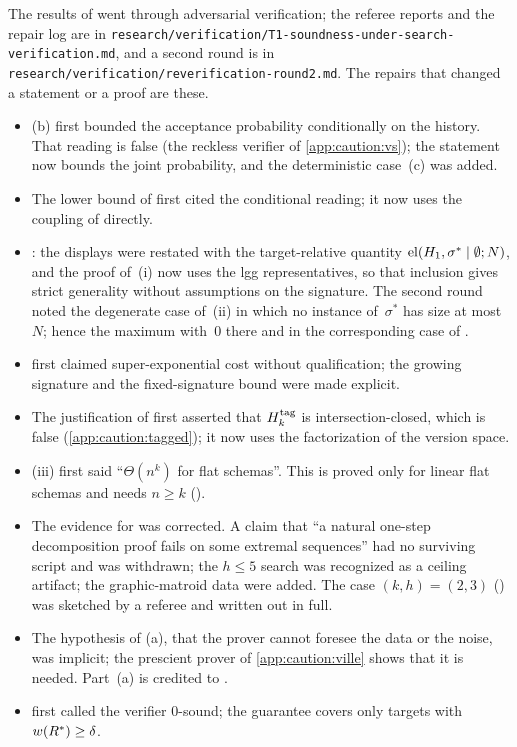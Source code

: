 The results of  went through adversarial verification; the referee reports and the repair log are in \texttt{research/verification/T1-soundness-under-search-verification.md}, and a second round is in \texttt{research/verification/reverification-round2.md}. The repairs that changed a statement or a proof are these.
\begin{itemize}
\item {}(b) first bounded the acceptance probability conditionally on the history. That reading is false (the reckless verifier of \cref{app:caution:vs}); the statement now bounds the joint probability, and the deterministic case~(c) was added.
\item The lower bound of  first cited the conditional reading; it now uses the coupling of  directly.
\item {}: the displays were restated with the target-relative quantity $\mathrm{el}(H_1,\sigma^*\mid\emptyset;N)$, and the proof of~(i) now uses the lgg representatives, so that inclusion gives strict generality without assumptions on the signature. The second round noted the degenerate case of~(ii) in which no instance of~$\sigma^*$ has size at most~$N$; hence the maximum with~$0$ there and in the corresponding case of .
\item {} first claimed super-exponential cost without qualification; the growing signature and the fixed-signature bound were made explicit.
\item The justification of  first asserted that $H^{\mathrm{tag}}_{k}$ is intersection-closed, which is false (\cref{app:caution:tagged}); it now uses the factorization of the version space.
\item {}(iii) first said ``$\Theta(n^k)$ for flat schemas''. This is proved only for linear flat schemas and needs $n\ge k$ ().
\item The evidence for  was corrected. A claim that ``a natural one-step decomposition proof fails on some extremal sequences'' had no surviving script and was withdrawn; the $h\le5$ search was recognized as a ceiling artifact; the graphic-matroid data were added. The case $(k,h)=(2,3)$ () was sketched by a referee and written out in full.
\item The hypothesis of (a), that the prover cannot foresee the data or the noise, was implicit; the prescient prover of \cref{app:caution:ville} shows that it is needed. Part~(a) is credited to \citet{waudbysmith2020confidence}.
\item {} first called the verifier $0$-sound; the guarantee covers only targets with $w(R^{*})\ge\delta$.
\end{itemize}
